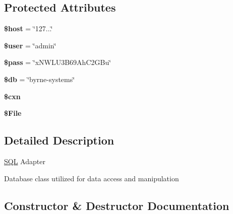 \subsection*{Protected Attributes}
\begin{DoxyCompactItemize}
\item 
\mbox{\label{class_w_a_f_f_l_e_1_1_framework_1_1_adapters_1_1_s_q_l_a711797613cb863ca0756df789c396bf2}} 
{\bfseries \$host} = \char`\"{}127...\char`\"{}
\item 
\mbox{\label{class_w_a_f_f_l_e_1_1_framework_1_1_adapters_1_1_s_q_l_a598ca4e71b15a1313ec95f0df1027ca5}} 
{\bfseries \$user} = \char`\"{}admin\char`\"{}
\item 
\mbox{\label{class_w_a_f_f_l_e_1_1_framework_1_1_adapters_1_1_s_q_l_a12ec2780b52bd1c54d38c2f981c0349f}} 
{\bfseries \$pass} = \char`\"{}x\+N\+W\+L\+U3\+B69\+Ah\+C2\+G\+Bu\char`\"{}
\item 
\mbox{\label{class_w_a_f_f_l_e_1_1_framework_1_1_adapters_1_1_s_q_l_a1fa3127fc82f96b1436d871ef02be319}} 
{\bfseries \$db} = \char`\"{}byrne-\/systems\char`\"{}
\item 
\mbox{\label{class_w_a_f_f_l_e_1_1_framework_1_1_adapters_1_1_s_q_l_afe14c5bdb9487c058ec831382f1fbacd}} 
{\bfseries \$cxn}
\item 
\mbox{\label{class_w_a_f_f_l_e_1_1_framework_1_1_adapters_1_1_s_q_l_a34cd105e27a4cb6632047ddfdfaa07e8}} 
{\bfseries \$\+File}
\end{DoxyCompactItemize}


\subsection{Detailed Description}
\hyperlink{class_w_a_f_f_l_e_1_1_framework_1_1_adapters_1_1_s_q_l}{S\+QL} Adapter

Database class utilized for data access and manipulation 

\subsection{Constructor \& Destructor Documentation}
\mbox{\label{class_w_a_f_f_l_e_1_1_framework_1_1_adapters_1_1_s_q_l_a095c5d389db211932136b53f25f39685}} 
